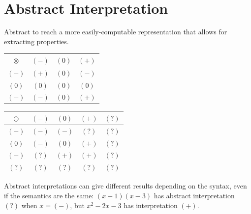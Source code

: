 \documentclass[a4paper, 11pt]{article}
\begin{document}
\section*{Abstract Interpretation}
{
    Abstract to reach a more easily-computable representation that allows for extracting properties.

    \begin{tabular}{c | c c c}
    \(\otimes\) & \((-)\) & \((0)\) & \((+)\) \\
    \hline
    \((-)\) & \((+)\) & \((0)\) & \((-)\) \\
    \((0)\) & \((0)\) & \((0)\) & \((0)\) \\
    \((+)\) & \((-)\) & \((0)\) & \((+)\)
    \end{tabular}
    \hspace{1cm}
    \begin{tabular}{c | c c c c}
    \(\oplus\) & \((-)\) & \((0)\) & \((+)\) & \((?)\) \\
    \hline
    \((-)\) & \((-)\) & \((-)\) & \((?)\) & \((?)\) \\
    \((0)\) & \((-)\) & \((0)\) & \((+)\) & \((?)\) \\
    \((+)\) & \((?)\) & \((+)\) & \((+)\) & \((?)\) \\
    \((?)\) & \((?)\) & \((?)\) & \((?)\) & \((?)\)
    \end{tabular}

    Abstract interpretations can give different results depending on the syntax, even if the semantics are the same: \((x+1)(x-3)\) has abstract interpretation \((?)\) when \(x = (-)\), but \(x^2 - 2x - 3\) has interpretation \((+)\).
}
\end{document}
